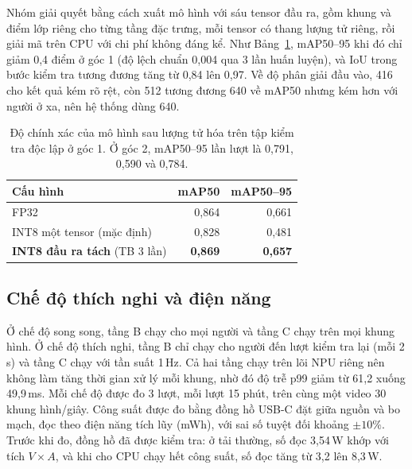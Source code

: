 \documentclass[11pt,a4paper,twocolumn]{article}
\begin{document}
Nhóm giải quyết bằng cách xuất mô hình với sáu tensor đầu ra, gồm khung và điểm lớp riêng cho từng tầng đặc trưng, mỗi tensor có thang lượng tử riêng, rồi giải mã trên CPU với chi phí
không đáng kể. Như Bảng~\ref{tab:int8}, mAP50--95 khi đó chỉ giảm 0,4 điểm ở góc 1 (độ lệch chuẩn 0,004 qua 3 lần huấn luyện), và IoU trong bước kiểm tra tương đương tăng từ 0,84 lên 0,97.
Về độ phân giải đầu vào, 416 cho kết quả kém rõ rệt, còn 512 tương đương 640 về mAP50 nhưng kém hơn với người ở xa, nên hệ thống dùng 640.

\begin{table}[t]
\centering
\caption{Độ chính xác của mô hình sau lượng tử hóa trên tập kiểm tra độc lập ở góc 1. Ở góc 2, mAP50--95 lần lượt là 0,791, 0,590 và 0,784.}
\label{tab:int8}
\footnotesize
\begin{tabular}{@{}lrr@{}}
\toprule
Cấu hình & mAP50 & mAP50--95 \\
\midrule
FP32 & 0,864 & 0,661 \\
INT8 một tensor (mặc định) & 0,828 & 0,481 \\
\textbf{INT8 đầu ra tách} (TB 3 lần) & \textbf{0,869} & \textbf{0,657} \\
\bottomrule
\end{tabular}
\end{table}

\subsection{Chế độ thích nghi và điện năng}
\label{sec:adapt}

Ở chế độ song song, tầng B chạy cho mọi người và tầng C chạy trên mọi khung hình. Ở chế độ thích nghi, tầng B chỉ chạy cho người đến lượt kiểm tra lại (mỗi 2\,s) và tầng C chạy với tần
suất 1\,Hz. Cả hai tầng chạy trên lõi NPU riêng nên không làm tăng thời gian xử lý mỗi khung, nhờ đó độ trễ p99 giảm từ 61,2 xuống 49,9\,ms. Mỗi chế độ được đo 3 lượt, mỗi lượt 15 phút,
trên cùng một video 30 khung hình/giây. Công suất được đo bằng đồng hồ USB-C đặt giữa nguồn và bo mạch, đọc theo điện năng tích lũy (mWh), với sai số tuyệt đối khoảng $\pm10\%$. Trước khi
đo, đồng hồ đã được kiểm tra: ở tải thường, số đọc 3,54\,W khớp với tích $V\!\times\!A$, và khi cho CPU chạy hết công suất, số đọc tăng từ 3,2 lên 8,3\,W.
\end{document}
